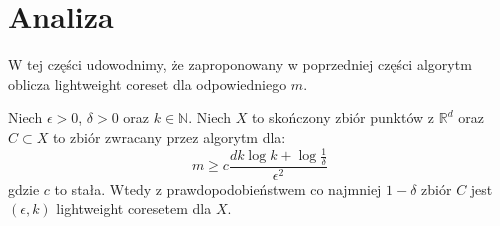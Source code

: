 \section{Analiza}

W tej części udowodnimy, że zaproponowany w poprzedniej części algorytm oblicza lightweight coreset dla odpowiedniego $m$.

\begin{thm}{\cite{bachem2017scalable}}
    Niech $\epsilon > 0$, $\delta > 0$ oraz $k \in \mathbb{N}$. 
    Niech $X$ to skończony zbiór punktów z $\mathbb{R}^{d}$ oraz $C \subset X$ to zbiór zwracany przez algorytm dla:
    \begin{equation}
        m \geq c\frac{dk \log{k} + \log{\frac{1}{\delta}}}{\epsilon^2} 
    \end{equation}
    gdzie $c$ to stała. 
    Wtedy z prawdopodobieństwem co najmniej $1-\delta$ zbiór $C$ jest $(\epsilon, k)$ lightweight coresetem dla $X$.
\end{thm}

